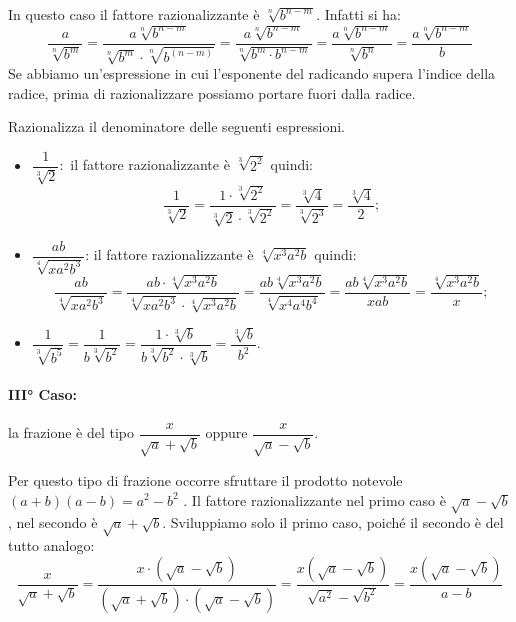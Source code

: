 In questo caso il fattore razionalizzante è $\sqrt[n]{b^{n-m}}$. Infatti si ha:
\begin{equation*}
\dfrac a{\sqrt[n]{b^m}}=
\dfrac{a\sqrt[n]{b^{n-m}}}{\sqrt[n]{b^m}\cdot \sqrt[n]{b^{(n-m)}}}=
\dfrac{a\sqrt[n]{b^{n-m}}}{\sqrt[n]{b^m\cdot b^{n-m}}}=
\dfrac{a\sqrt[n]{b^{n-m}}}{\sqrt[n]{b^n}}=\dfrac{a\sqrt[n]{b^{n-m}}} b
\end{equation*}
Se abbiamo un'espressione in cui l'esponente del radicando supera l'indice 
della radice, prima di razionalizzare possiamo portare fuori dalla radice.

\begin{exrig}
 \begin{esempio}
Razionalizza il denominatore delle seguenti espressioni.
\begin{itemize}
 \item $\dfrac 1{\sqrt[3]2}$:\, il fattore razionalizzante è $\sqrt[3]{2^2}$ 
  quindi:
  \[\dfrac 1{\sqrt[3]2}=
  \dfrac{1\cdot \sqrt[3]{2^2}}{\sqrt[3]2\cdot \sqrt[3]{2^2}}=
  \dfrac{\sqrt[3]4}{\sqrt[3]{2^3}}=\dfrac{\sqrt[3]4} 2;\]
 \item $\dfrac{ab}{\sqrt[4]{xa^2b^3}}$:
 il fattore razionalizzante è $\sqrt[4]{x^3a^2b}$
 quindi: 
 \[\dfrac{ab}{\sqrt[4]{xa^2b^3}}=
 \dfrac{ab\cdot \sqrt[4]{x^3a^2b}}{\sqrt[4]{xa^2b^3}\cdot \sqrt[4]{x^3a^2b}}=
 \dfrac{ab\sqrt[4]{x^3a^2b}}{\sqrt[4]{x^4a^4b^4}}=
 \dfrac{ab\sqrt[4]{x^3a^2b}}{xab}=\dfrac{\sqrt[4]{x^3a^2b}} x;\]
 \item $\dfrac 1{\sqrt[3]{b^5}}=\dfrac 1{b\sqrt[3]{b^2}}=
        \dfrac{1\cdot \sqrt[3]b}{b\sqrt[3]{b^2}\cdot \sqrt[3]b}=
        \dfrac{\sqrt[3]b}{b^2}$.
\end{itemize}
 \end{esempio}
\end{exrig}


\paragraph{III° Caso:} 
la frazione è del tipo $\dfrac x{\sqrt a+\sqrt b}$ 
oppure $\dfrac x{\sqrt a-\sqrt b}$.

Per questo tipo di frazione occorre sfruttare il prodotto notevole 
$(a+b)(a-b)=a^2-b^2$ . Il fattore razionalizzante nel primo caso è $\sqrt a-\sqrt b$, nel secondo è $\sqrt a+\sqrt b$.
Sviluppiamo solo il primo caso, poiché il secondo è del tutto analogo:
\begin{equation*}
\dfrac x{\sqrt a+\sqrt b}=
\dfrac{x\cdot (\sqrt a-\sqrt b)}{(\sqrt a+\sqrt b)\cdot (\sqrt a-\sqrt b)}=
\dfrac{x(\sqrt a-\sqrt b)}{\sqrt{a^2}-\sqrt{b^2}}=
\dfrac{x(\sqrt a-\sqrt b)}{a-b}
\end{equation*}

